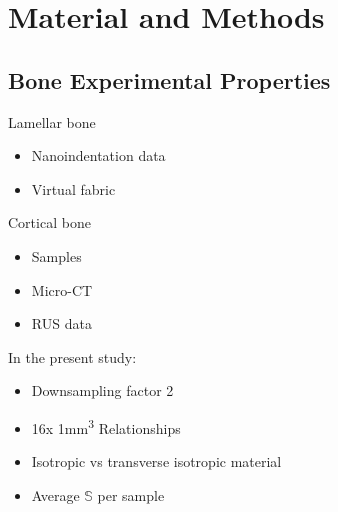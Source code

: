 \documentclass[a4paper,fleqn]{DC_ArtStyle}
\begin{document}
	
	\newpage
	\section{Material and Methods}

	\subsection{Bone Experimental Properties}
	Lamellar bone
	\begin{itemize}
		\item Nanoindentation data
		\item Virtual fabric
	\end{itemize}

	Cortical bone
	\begin{itemize}
		\item Samples
		\item Micro-CT
		\item RUS data
	\end{itemize}

	In the present study:
	\begin{itemize}
		\item Downsampling factor 2
		\item 16x 1mm\textsuperscript{3} Relationships
		\item Isotropic vs transverse isotropic material
		\item Average $\mathbb{S}$ per sample
	\end{itemize}
\end{document}
